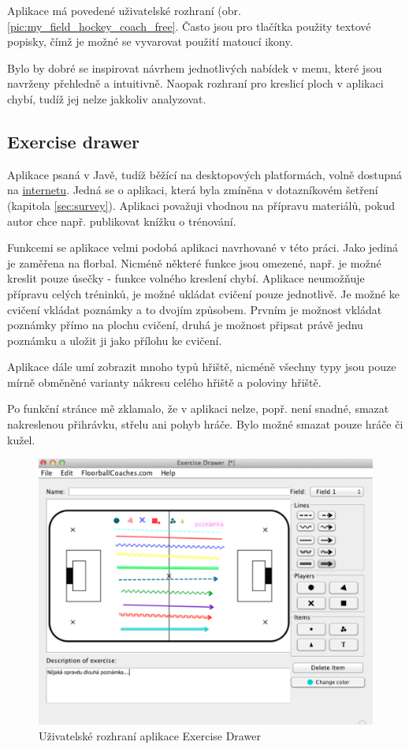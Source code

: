 \documentclass[thesis=B,czech]{FITthesis}[2012/06/26]
\begin{document}
	Aplikace má povedené uživatelské rozhraní (obr. \ref{pic:my_field_hockey_coach_free}. Často jsou pro tlačítka použity textové popisky, čímž je možné se vyvarovat použití matoucí ikony.

	Bylo by dobré se inspirovat návrhem jednotlivých nabídek v menu, které jsou navrženy přehledně a intuitivně. Naopak rozhraní pro kreslicí ploch v aplikaci chybí, tudíž jej nelze jakkoliv analyzovat.

	\subsection{Exercise drawer}

	Aplikace psaná v Javě, tudíž běžící na desktopových platformách, volně dostupná na \href{http://floorballcoach.org/exercisedrawer/}{internetu}. Jedná se o aplikaci, která byla zmíněna v dotazníkovém šetření (kapitola \ref{sec:survey}). Aplikaci považuji vhodnou na přípravu materiálů, pokud autor chce např. publikovat knížku o trénování.

	Funkcemi se aplikace velmi podobá aplikaci navrhované v této práci. Jako jediná je zaměřena na florbal. Nicméně některé funkce jsou omezené, např. je možné kreslit pouze úsečky \-- funkce volného kreslení chybí. Aplikace neumožňuje přípravu celých tréninků, je možné ukládat cvičení pouze jednotlivě. Je možné ke cvičení vkládat poznámky a to dvojím způsobem. Prvním je možnost vkládat poznámky přímo na plochu cvičení, druhá je možnost připsat právě jednu poznámku a uložit ji jako přílohu ke cvičení.

	Aplikace dále umí zobrazit mnoho typů hřiště, nicméně všechny typy jsou pouze mírně obměněné varianty nákresu celého hřiště a poloviny hřiště.

	Po funkční stránce mě zklamalo, že v aplikaci nelze, popř. není snadné, smazat nakreslenou přihrávku, střelu ani pohyb hráče. Bylo možné smazat pouze hráče či kužel.

	\begin{figure}[h!]
		\centering
		\includegraphics[width=\textwidth]{img/competition/exercise_drawer}
		\caption{Uživatelské rozhraní aplikace Exercise Drawer}
		\label{pic:exercise_drawer}
	\end{figure}
\end{document}
